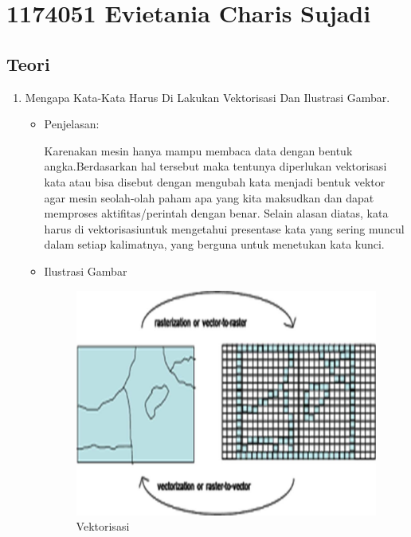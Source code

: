 \section{1174051 Evietania Charis Sujadi}
\subsection{Teori}

\begin{enumerate}
\item Mengapa Kata-Kata Harus Di Lakukan Vektorisasi Dan Ilustrasi Gambar.
\begin{itemize}
\item Penjelasan:

Karenakan mesin hanya mampu membaca data dengan bentuk angka.Berdasarkan hal tersebut maka tentunya diperlukan vektorisasi kata atau bisa disebut dengan mengubah kata menjadi bentuk vektor agar mesin seolah-olah paham apa yang kita maksudkan dan dapat memproses aktifitas/perintah dengan benar. Selain alasan diatas, kata harus di vektorisasiuntuk mengetahui presentase kata yang sering muncul dalam setiap kalimatnya, yang berguna untuk menetukan kata kunci.

\item Ilustrasi Gambar

\begin{figure}[H]
\centering
\includegraphics[scale=0.3]{figures/1174051/5/5.jpg}
\caption{Vektorisasi}
\label{Vektorisasi}
\end{figure}

\end{itemize}


\end{enumerate}
